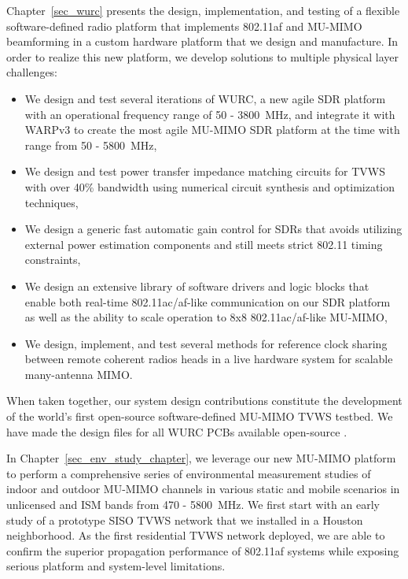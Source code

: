 	Chapter~\ref{sec_wurc} presents the design, implementation, and testing of a flexible software-defined radio platform that implements 802.11af and \ac{MU-MIMO} beamforming in a custom hardware platform that we design and manufacture.
	In order to realize this new platform, we develop solutions to multiple physical layer challenges:
\begin{itemize}
	\item We design and test several iterations of \ac{WURC}, a new agile \ac{SDR} platform with an operational frequency range of 50 - 3800~MHz, and integrate it with WARPv3 to create the most agile MU-MIMO SDR platform at the time with range from 50 - 5800~MHz,
	\item We design and test power transfer impedance matching circuits for \ac{TVWS} with over 40\% bandwidth using numerical circuit synthesis and optimization techniques,
	\item We design a generic fast automatic gain control for \acp{SDR} that avoids utilizing external power estimation components and still meets strict 802.11 timing constraints,
	\item We design an extensive library of software drivers and logic blocks that enable both real-time 802.11ac/af-like communication on our \ac{SDR} platform as well as the ability to scale operation to 8x8 802.11ac/af-like MU-MIMO,
	\item We design, implement, and test several methods for reference clock sharing between remote coherent radios heads in a live hardware system for scalable many-antenna \ac{MIMO}.
\end{itemize}
	When taken together, our system design contributions constitute the development of the world's first open-source software-defined \ac{MU-MIMO} \ac{TVWS} testbed.
	We have made the design files for all \ac{WURC} \acp{PCB} available open-source \cite{guerra2012wurc_pcb}.
	
	In Chapter~\ref{sec_env_study_chapter}, we leverage our new \ac{MU-MIMO} platform to perform a comprehensive series of environmental measurement studies of indoor and outdoor \ac{MU-MIMO} channels in various static and mobile scenarios in unlicensed and \ac{ISM} bands from 470 - 5800~MHz.
	We first start with an early study of a prototype \ac{SISO} \ac{TVWS} network that we installed in a Houston neighborhood.
	As the first residential \ac{TVWS} network deployed, we are able to confirm the superior propagation performance of 802.11af systems while exposing serious platform and system-level limitations.
	

